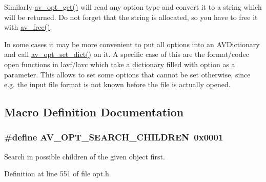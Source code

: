 Similarly \hyperlink{group__opt__get__funcs_gaf31144e60f9ce89dbe8cbea57a0b232c}{av\+\_\+opt\+\_\+get()} will read any option type and convert it to a string which will be returned. Do not forget that the string is allocated, so you have to free it with \hyperlink{group__lavu__mem_ga0c9096f498624c525aa2315b8a20c411}{av\+\_\+free()}.

In some cases it may be more convenient to put all options into an A\+V\+Dictionary and call \hyperlink{group__avoptions_gaf1a88e8f152d7835f111b1ef8813fb2e}{av\+\_\+opt\+\_\+set\+\_\+dict()} on it. A specific case of this are the format/codec open functions in lavf/lavc which take a dictionary filled with option as a parameter. This allows to set some options that cannot be set otherwise, since e.\+g. the input file format is not known before the file is actually opened. 

\subsection{Macro Definition Documentation}
\subsubsection[{\texorpdfstring{A\+V\+\_\+\+O\+P\+T\+\_\+\+S\+E\+A\+R\+C\+H\+\_\+\+C\+H\+I\+L\+D\+R\+EN}{AV_OPT_SEARCH_CHILDREN}}]{\setlength{\rightskip}{0pt plus 5cm}\#define A\+V\+\_\+\+O\+P\+T\+\_\+\+S\+E\+A\+R\+C\+H\+\_\+\+C\+H\+I\+L\+D\+R\+EN~0x0001}\hypertarget{group__avoptions_ga25801ba4fc9b5313eb33ec84e082dd72}{}\label{group__avoptions_ga25801ba4fc9b5313eb33ec84e082dd72}
Search in possible children of the given object first. 

Definition at line 551 of file opt.\+h.

